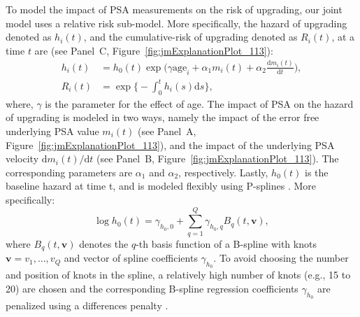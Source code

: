 To model the impact of PSA measurements on the risk of upgrading, our joint model uses a relative risk sub-model. More specifically, the hazard of upgrading denoted as $h_i(t)$, and the cumulative-risk of upgrading denoted as $R_i(t)$, at a time $t$ are (see Panel~C, Figure~\ref{fig:jmExplanationPlot_113}):
\begin{equation}
\label{eq:rel_risk_model}
\begin{split}
    h_i(t) &= h_0(t) \exp\Big(\gamma \mbox{age}_i +\alpha_{1} m_{i}(t) + \alpha_{2} \frac{\mathrm{d}m_{i}(t)}{\mathrm{d}{t}}\Big),\\
    R_i(t) &= \exp\Big\{-\int_0^{t} h_i(s)\mathrm{d}{s}\Big\},
    \end{split}
\end{equation}
where, $\gamma$ is the parameter for the effect of age. The impact of PSA on the hazard of upgrading is modeled in two ways, namely the impact of the error free underlying PSA value $m_{i}(t)$ (see Panel~A, Figure~\ref{fig:jmExplanationPlot_113}), and the impact of the underlying PSA velocity $\mathrm{d}m_{i}(t)/\mathrm{d}{t}$ (see Panel~B, Figure~\ref{fig:jmExplanationPlot_113}). The corresponding parameters are $\alpha_{1}$ and $\alpha_{2}$, respectively. Lastly, $h_0(t)$ is the baseline hazard at time t, and is modeled flexibly using P-splines \citep{eilers1996flexible}. More specifically:
\begin{equation*}
\log{h_0(t)} = \gamma_{h_0,0} + \sum_{q=1}^Q \gamma_{h_0,q} B_q(t, \boldsymbol{v}),
\end{equation*}
where $B_q(t, \boldsymbol{v})$ denotes the $q$-th basis function of a B-spline with knots $\boldsymbol{v} = v_1, \ldots, v_Q$ and vector of spline coefficients $\gamma_{h_0}$. To avoid choosing the number and position of knots in the spline, a relatively high number of knots (e.g., 15 to 20) are chosen and the corresponding B-spline regression coefficients $\gamma_{h_0}$ are penalized using a differences penalty \citep{eilers1996flexible}.



